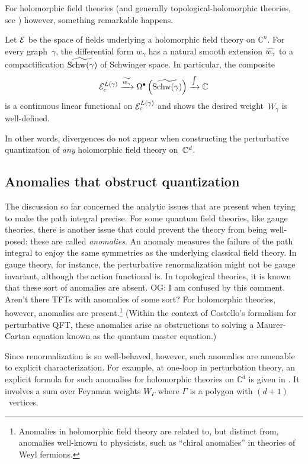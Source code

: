 \documentclass[11pt]{amsart}
\def\til{\Tilde}
\def\C{{\mathbb{C}}}
\renewcommand{\op}{\operatorname}
\def\owen#1{{\textcolor{violet!50!black}{OG: {#1}}}}
\begin{document}
For holomorphic field theories (and generally topological-holomorphic theories, see \cite{WWthf}) however, something remarkable happens.

\begin{thm}[Wang, \owen{precise citations}]
Let $\mathcal E$ be the space of fields underlying a holomorphic field theory on $\C^n$.
For every graph~$\gamma$, the differential form $w_{\gamma}$ has a natural smooth extension $\til {w_\gamma}$ to a compactification $\til{\op{Schw}(\gamma)}$ of Schwinger space.
In particular, the composite
\[
\cE^{L(\gamma)}_c \xto{\til{w_\gamma}}\Omega^\bu \left( \til{\op{Schw}(\gamma)} \right) \xto{\int} \C
\]
is a continuous linear functional on $\mathcal E_c^{L(\gamma)}$ and shows the desired weight~$W_\gamma$ is well-defined.
\end{thm}

In other words, divergences do not appear when constructing the perturbative quantization of {\em any} holomorphic field theory on~$\mathbb C^d$.

\subsection{Anomalies that obstruct quantization}

The discussion so far concerned the analytic issues that are present when trying to make the path integral precise.
For some quantum field theories, like gauge theories, there is another issue that could prevent the theory from being well-posed:
these are called {\em anomalies}.
An anomaly measures the failure of the path integral to enjoy the same symmetries as the underlying classical field theory.
In gauge theory, for instance, the perturbative renormalization might not be gauge invariant, although the action functional is.
In topological theories, it is known that these sort of anomalies are absent.
\owen{I am confused by this comment. Aren't there TFTs with anomalies of some sort?}
For holomorphic theories, however, anomalies are present.\footnote{Anomalies in holomorphic field theory are related to, but distinct from, anomalies well-known to physicists, such as ``chiral anomalies'' in theories of Weyl fermions.}
(Within the context of Costello's formalism for perturbative QFT,
these anomalies arise as obstructions to solving a Maurer-Cartan equation known as the quantum master equation.)

Since renormalization is so well-behaved, however, such anomalies are amenable to explicit characterization.
For example, at one-loop in perturbation theory, an explicit formula for such anomalies for holomorphic theories on $\C^d$ is given in \cite{Whol}.
It involves a sum over Feynman weights $W_\Gamma$ where $\Gamma$ is a polygon with $(d+1)$~vertices.
\end{document}
